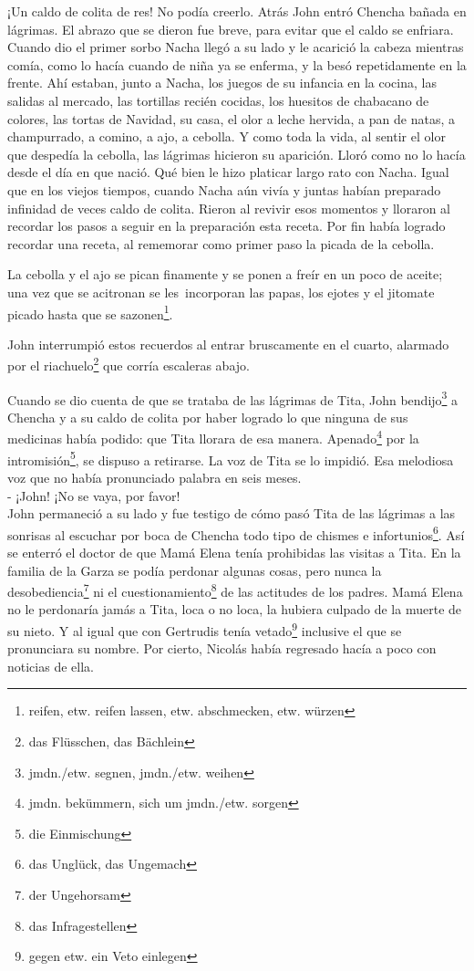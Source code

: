 ¡Un caldo de colita de res! No podía creerlo. Atrás John entró Chencha
bañada en lágrimas. El abrazo que se dieron fue breve, para evitar que
el caldo se enfriara. Cuando dio el primer sorbo Nacha llegó a su lado y
le acarició la cabeza mientras comía, como lo hacía cuando de niña ya se
enferma, y la besó repetidamente en la frente. Ahí estaban, junto a
Nacha, los juegos de su infancia en la cocina, las salidas al mercado,
las tortillas recién cocidas, los huesitos de chabacano de colores, las
tortas de Navidad, su casa, el olor a leche hervida, a pan de natas, a
champurrado, a comino, a ajo, a cebolla. Y como toda la vida, al sentir
el olor que despedía la cebolla, las lágrimas hicieron su aparición.
Lloró como no lo hacía desde el día en que nació. Qué bien le hizo
platicar largo rato con Nacha. Igual que en los viejos tiempos, cuando
Nacha aún vivía y juntas habían preparado infinidad de veces caldo de
colita. Rieron al revivir esos momentos y lloraron al recordar los pasos
a seguir en la preparación esta receta. Por fin había logrado recordar
una receta, al rememorar como primer paso la picada de la cebolla.

La cebolla y el ajo se pican finamente y se ponen a freír en un poco de
aceite; una vez que se acitronan se les~incorporan las papas, los
ejotes y el jitomate picado hasta que se sazonen\footnote{reifen, etw. reifen lassen, etw. abschmecken, etw. würzen}.

John interrumpió estos recuerdos al entrar bruscamente en el cuarto,
alarmado por el riachuelo\footnote{das Flüsschen, das Bächlein}
que corría escaleras abajo.

Cuando se dio cuenta de que se trataba de las lágrimas de Tita, John bendijo\footnote{jmdn./etw. segnen, jmdn./etw. weihen}
a Chencha y a su caldo de colita por haber logrado lo que
ninguna de sus medicinas había podido: que Tita llorara de esa manera. Apenado\footnote{jmdn. bekümmern, sich um jmdn./etw. sorgen }
por la intromisión\footnote{die Einmischung}, se dispuso
a retirarse. La voz de Tita se lo impidió. Esa melodiosa voz que no había
pronunciado palabra en seis meses.
\\- ¡John! ¡No se vaya, por favor!\\

John permaneció a su lado y fue testigo de cómo pasó Tita de las
lágrimas a las sonrisas al escuchar por boca de Chencha todo tipo de
chismes e infortunios\footnote{das Unglück, das Ungemach}.
Así se enterró el doctor de que Mamá Elena tenía
prohibidas las visitas a Tita. En la familia de la Garza se podía
perdonar algunas cosas, pero nunca la desobediencia\footnote{der Ungehorsam}
ni el cuestionamiento\footnote{das Infragestellen} de
las actitudes de los padres. Mamá Elena no le perdonaría jamás a Tita,
loca o no loca, la hubiera culpado de la muerte de su nieto. Y al igual
que con Gertrudis tenía vetado\footnote{gegen etw. ein Veto einlegen}
inclusive el que se pronunciara su nombre. Por cierto, Nicolás había
regresado hacía a poco con noticias de ella.

